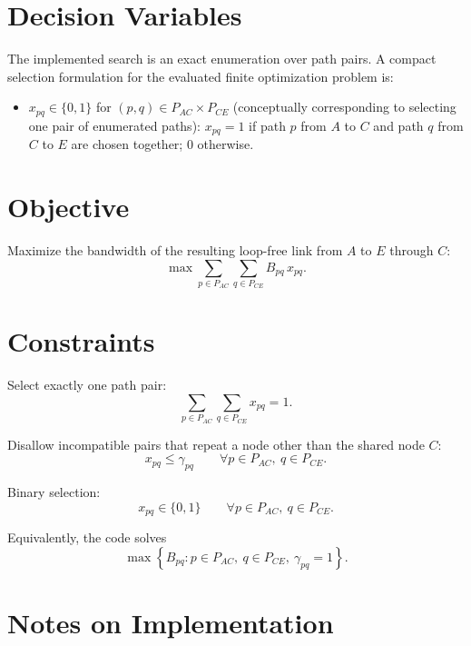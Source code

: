 \section*{Decision Variables}

The implemented search is an exact enumeration over path pairs. A compact selection formulation for the evaluated finite optimization problem is:

\begin{itemize}
    \item $x_{pq}\in\{0,1\}$ for $(p,q)\in P_{AC}\times P_{CE}$ (conceptually corresponding to selecting one pair of enumerated paths): $x_{pq}=1$ if path $p$ from $A$ to $C$ and path $q$ from $C$ to $E$ are chosen together; $0$ otherwise.
\end{itemize}

\section*{Objective}

Maximize the bandwidth of the resulting loop-free link from $A$ to $E$ through $C$:
\[
\max \sum_{p\in P_{AC}}\sum_{q\in P_{CE}} B_{pq}\, x_{pq}.
\]

\section*{Constraints}

Select exactly one path pair:
\[
\sum_{p\in P_{AC}}\sum_{q\in P_{CE}} x_{pq} = 1.
\]

Disallow incompatible pairs that repeat a node other than the shared node $C$:
\[
x_{pq} \le \gamma_{pq}
\qquad \forall p\in P_{AC},\ q\in P_{CE}.
\]

Binary selection:
\[
x_{pq}\in\{0,1\}
\qquad \forall p\in P_{AC},\ q\in P_{CE}.
\]

Equivalently, the code solves
\[
\max \left\{ B_{pq} : p\in P_{AC},\ q\in P_{CE},\ \gamma_{pq}=1 \right\}.
\]

\section*{Notes on Implementation}


